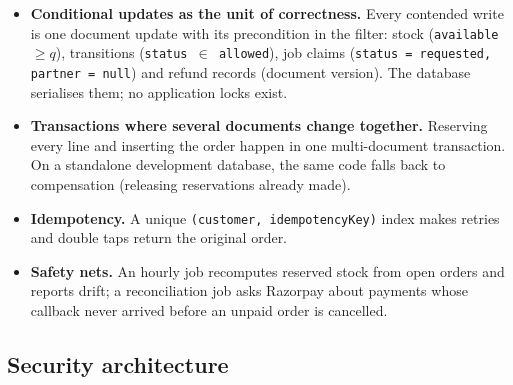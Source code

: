 \documentclass[manuscript,screen,review]{acmart}
\begin{document}
\begin{itemize}
  \item \textbf{Conditional updates as the unit of correctness.} Every contended write is one document update with its precondition in the filter: stock (\texttt{available $\ge q$}), transitions (\texttt{status $\in$ allowed}), job claims (\texttt{status = requested, partner = null}) and refund records (document version). The database serialises them; no application locks exist.
  \item \textbf{Transactions where several documents change together.} Reserving every line and inserting the order happen in one multi-document transaction. On a standalone development database, the same code falls back to compensation (releasing reservations already made).
  \item \textbf{Idempotency.} A unique \texttt{(customer, idempotencyKey)} index makes retries and double taps return the original order.
  \item \textbf{Safety nets.} An hourly job recomputes reserved stock from open orders and reports drift; a reconciliation job asks Razorpay about payments whose callback never arrived before an unpaid order is cancelled.
\end{itemize}

\subsection{Security architecture}
\end{document}
